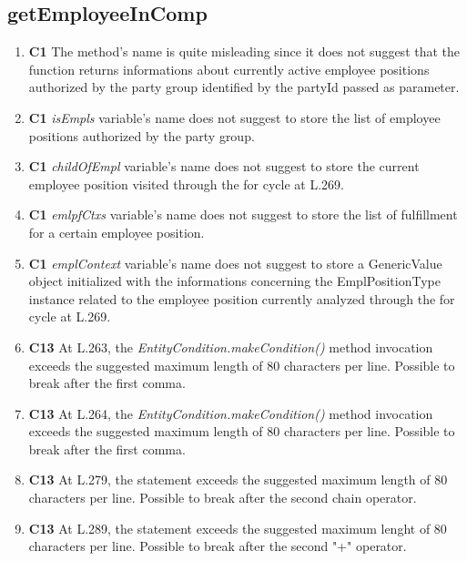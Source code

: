 \subsection{getEmployeeInComp}

\begin{enumerate}
	\item \textbf{C1} The method's name is quite misleading since it does not suggest that the function returns informations about currently active employee positions authorized by the party group identified by the partyId passed as parameter.

	\item \textbf{C1} \textit{isEmpls} variable's name does not suggest to store the list of employee positions authorized by the party group.

	\item \textbf{C1} \textit{childOfEmpl} variable's name does not suggest to store the current employee position visited through the for cycle at L.269.

	\item \textbf{C1} \textit{emlpfCtxs} variable's name does not suggest to store the list of fulfillment for a certain employee position.

	\item \textbf{C1} \textit{emplContext} variable's name does not suggest to store a GenericValue object initialized with the informations concerning the EmplPositionType instance related to the employee position currently analyzed through the for cycle at L.269.

	\item \textbf{C13} At L.263, the \textit{EntityCondition.makeCondition()} method invocation exceeds the suggested maximum length of 80 characters per line. Possible to break after the first comma.

	\item \textbf{C13} At L.264, the \textit{EntityCondition.makeCondition()} method invocation exceeds the suggested maximum length of 80 characters per line. Possible to break after the first comma.
	
	\item \textbf{C13} At L.279, the statement exceeds the suggested maximum length of 80 characters per line. Possible to break after the second chain operator.

	\item \textbf{C13} At L.289, the statement exceeds the suggested maximum lenght of 80 characters per line. Possible to break after the second "+" operator.


\end{enumerate}

